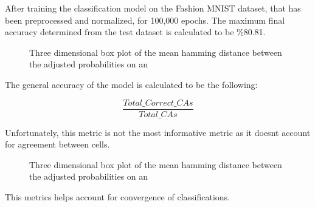 \documentclass[conference]{IEEEtran}
\begin{document}
After training the classification model on the Fashion MNIST dataset, that has been preprocessed and normalized, for 100,000 epochs. The maximum final accuracy determined from the test dataset is calculated to be \%80.81.

\begin{figure}[htbp]
\caption{Three dimensional box plot of the mean hamming distance between the adjusted probabilities on an }
\end{figure}

The general accuracy of the model is calculated to be the following:

\begin{equation}
    \frac{Total\_Correct\_CAs} {Total\_CAs}
\end{equation}

Unfortunately, this metric is not the most informative metric as it doesnt account for agreement between cells.

\begin{figure}[htbp]
\caption{Three dimensional box plot of the mean hamming distance between the adjusted probabilities on an }
\end{figure}

This metrics helps account for convergence of classifications.
\end{document}
